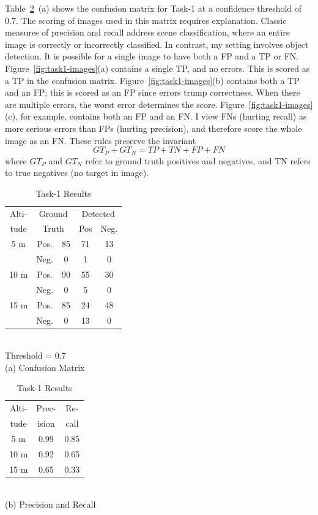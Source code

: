 Table~\ref{tab:task1-results}~(a) shows the confusion matrix for
Task-1 at a confidence threshold of 0.7.  The scoring of images used
in this matrix requires explanation. Classic measures of precision and
recall address scene classification, where an entire image is
correctly or incorrectly classified.  In contrast, my setting
involves object detection.  It is possible for a single image to have
both a FP and a TP or FN.  Figure~\ref{fig:task1-images}(a) contains
a single TP, and no errors.  This is scored as a TP in the confusion
matrix.  Figure~\ref{fig:task1-images}(b) contains both a TP and an
FP; this is scored as an FP since errors trump correctness.  When
there are multiple errors, the worst error determines the score.
Figure~\ref{fig:task1-images}(c), for example, contains both an FP and
an FN.  I view FNs (hurting recall) as more serious errors than FPs
(hurting precision), and therefore score the whole image as an FN.
These rules preserve the invariant
$$GT_P + GT_N = TP + TN + FP + FN$$
where $GT_P$ and $GT_N$ refer to ground truth positives and negatives,
and TN refers to true negatives (no target in image).

\begin{table}
\centering\small
\begin{minipage}[b]{2.4in}
\centering\small
\begin{tabular}{|c|c|c|c|c|}
\hline
Alti-&\multicolumn{2}{c|}{Ground}&\multicolumn{2}{c|}{Detected}\\
\cline{4-5}
tude&\multicolumn{2}{c|}{Truth}& Pos& Neg.\\
\hline
5 m & Pos. & 85 & 71 & 13\\
    & Neg. &  0 & 1  & 0\\
\hline
10 m & Pos. & 90 & 55 & 30\\
     & Neg. &  0 & 5  & 0 \\
\hline
15 m & Pos. & 85 & 24 & 48 \\
     & Neg. &  0 & 13 & 0\\
\hline
\end{tabular}\\[0.05in]
{\footnotesize Threshold = 0.7}\\
(a) Confusion Matrix\\
\end{minipage}
\begin{minipage}[b]{1.4in}
\centering
\begin{tabular}{|c|c|c|}
\hline
Alti-& Prec- & Re-\\
tude & ision & call\\
\hline
5 m & 0.99 & 0.85 \\
10 m &0.92 & 0.65\\
15 m & 0.65 & 0.33 \\
\hline
\end{tabular}\\[0.05in]
(b) Precision and Recall
\end{minipage}

\caption{Task-1 Results}
\label{tab:task1-results}
\vspace{-0.2in}
\end{table}


